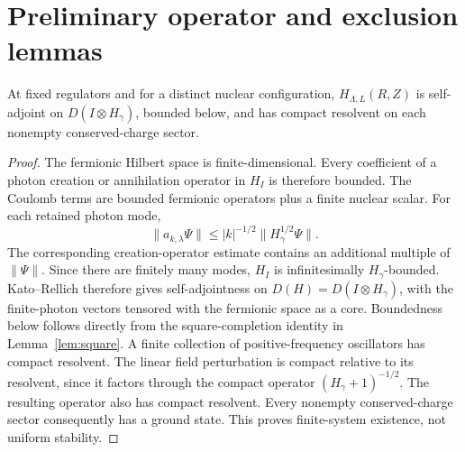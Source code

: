\section{Preliminary operator and exclusion lemmas}
\label{sec:lemmas}
\begin{lemma}
At fixed regulators and for a distinct nuclear configuration,
\(H_{\Lambda,L}(R,Z)\) is self-adjoint on \(D(I\otimes H_\gamma)\), bounded
below, and has compact resolvent on each nonempty conserved-charge sector.
\end{lemma}
\begin{proof}
The fermionic Hilbert space is finite-dimensional. Every coefficient of a
photon creation or annihilation operator in \(H_I\) is therefore bounded.
The Coulomb terms are bounded fermionic operators plus a finite nuclear scalar.
For each retained photon mode,
\begin{equation}
\|a_{k,\lambda}\Psi\|
\le |k|^{-1/2}\|H_\gamma^{1/2}\Psi\|.
\end{equation}
The corresponding creation-operator estimate contains an additional
multiple of \(\|\Psi\|\). Since there are finitely many modes, \(H_I\) is
infinitesimally \(H_\gamma\)-bounded.
Kato--Rellich therefore gives self-adjointness on
\(D(H)=D(I\otimes H_\gamma)\), with the finite-photon vectors tensored
with the fermionic space as a core.
Boundedness below follows directly from the square-completion identity in
Lemma~\ref{lem:square}. A finite collection of positive-frequency
oscillators has compact resolvent. The linear field perturbation is compact
relative to its resolvent, since it factors through the compact operator
\((H_\gamma+1)^{-1/2}\). The resulting operator also has compact resolvent.
Every nonempty conserved-charge sector consequently has a ground state.
This proves finite-system existence, not uniform stability.
\end{proof}

